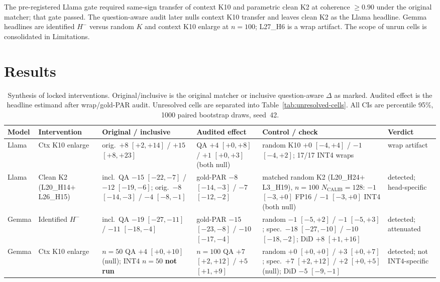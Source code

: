 \documentclass{article} %
\begin{document}
The pre-registered Llama gate required same-sign transfer of context K10 and parametric clean K2 at coherence $\ge 0.90$ under the original matcher; that gate passed. The question-aware audit later nulls context K10 transfer and leaves clean K2 as the Llama headline. Gemma headlines are identified $H^{-}$ versus random $K$ and context K10 enlarge at $n{=}100$; L27\_H6 is a wrap artifact. The scope of unrun cells is consolidated in Limitations.

\section{Results}
\label{sec:results}

\begin{table}[t]
\caption{Synthesis of locked interventions. Original/inclusive is the original matcher or inclusive question-aware $\Delta$ as marked. Audited effect is the headline estimand after wrap/gold-PAR audit. Unresolved cells are separated into Table~\ref{tab:unresolved-cells}. All CIs are percentile 95\%, 1000 paired bootstrap draws, seed~42.}
\label{tab:synthesis}
\centering\scriptsize
\setlength{\tabcolsep}{2.5pt}
\begin{tabular}{llp{1.28in}p{1.28in}p{1.15in}p{0.78in}}
\toprule
Model & Intervention & Original / inclusive & Audited effect & Control / check & Verdict \\
\midrule
Llama & Ctx K10 enlarge & orig.\ $+8$ $[+2,+14]$ / $+15$ $[+8,+23]$ & QA $+4$ $[+0,+8]$ / $+1$ $[+0,+3]$ (both null) & random K10 $+0$ $[-4,+4]$ / $-1$ $[-4,+2]$; 17/17 INT4 wraps & wrap artifact \\
Llama & Clean K2 (L20\_H14$+$L26\_H15) & incl.\ QA $-15$ $[-22,-7]$ / $-12$ $[-19,-6]$; orig.\ $-8$ $[-14,-3]$ / $-4$ $[-8,-1]$ & gold-PAR $-8$ $[-14,-3]$ / $-7$ $[-12,-2]$ & matched random K2 (L20\_H24$+$L3\_H19), $n{=}100$ $N_{\mathrm{CALIB}}{=}128$: $-1$ $[-3,+0]$ FP16 / $-1$ $[-3,+0]$ INT4 (both null) & detected; head-specific \\
Gemma & Identified $H^{-}$ & incl.\ QA $-19$ $[-27,-11]$ / $-11$ $[-18,-4]$ & gold-PAR $-15$ $[-23,-8]$ / $-10$ $[-17,-4]$ & random $-1$ $[-5,+2]$ / $-1$ $[-5,+3]$; spec.\ $-18$ $[-27,-10]$ / $-10$ $[-18,-2]$; DiD $+8$ $[+1,+16]$ & detected; attenuated \\
Gemma & Ctx K10 enlarge & $n{=}50$ QA $+4$ $[+0,+10]$ (null); INT4 $n{=}50$ \textbf{not run} & $n{=}100$ QA $+7$ $[+2,+12]$ / $+5$ $[+1,+9]$ & random $+0$ $[+0,+0]$ / $+3$ $[+0,+7]$; spec.\ $+7$ $[+2,+12]$ / $+2$ $[+0,+5]$ (null); DiD $-5$ $[-9,-1]$ & detected; not INT4-specific \\

\end{tabular}
\end{table}
\end{document}
